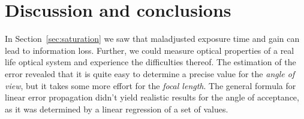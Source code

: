 \documentclass[a4paper, 12pt]{paper}
\begin{document}
\section{Discussion and conclusions}

In Section~\ref{sec:saturation} we saw that maladjusted exposure time and gain can lead to information loss.
Further, we could measure optical properties of a real life optical system and experience the difficulties thereof.
The estimation of the error revealed that it is quite easy to determine a precise value for the \emph{angle of view}, but it takes some more effort for the \emph{focal length}.
The general formula for linear error propagation didn't yield realistic results for the angle of acceptance, as it was determined by a linear regression of a set of values.
\end{document}

